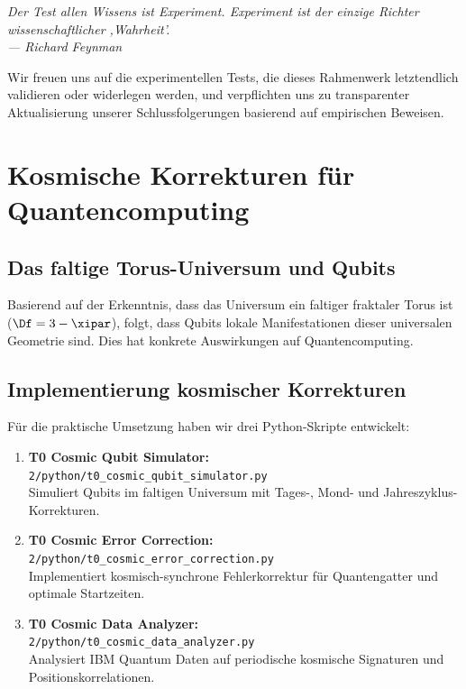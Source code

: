 \begin{center}
	\textit{Der Test allen Wissens ist Experiment. Experiment ist der einzige Richter wissenschaftlicher ,Wahrheit'.}\\
	\textit{--- Richard Feynman}
\end{center}

Wir freuen uns auf die experimentellen Tests, die dieses Rahmenwerk letztendlich validieren oder widerlegen werden, und verpflichten uns zu transparenter Aktualisierung unserer Schlussfolgerungen basierend auf empirischen Beweisen.

\section{Kosmische Korrekturen für Quantencomputing}
\label{sec:cosmic_corrections}

\subsection{Das faltige Torus-Universum und Qubits}

Basierend auf der Erkenntnis, dass das Universum ein faltiger fraktaler Torus ist 
($\Df = 3 - \xipar$), folgt, dass Qubits lokale Manifestationen dieser 
universalen Geometrie sind. Dies hat konkrete Auswirkungen auf Quantencomputing.

\subsection{Implementierung kosmischer Korrekturen}

Für die praktische Umsetzung haben wir drei Python-Skripte entwickelt:

\begin{enumerate}
	\item \textbf{T0 Cosmic Qubit Simulator:} \\
	\texttt{2/python/t0\_cosmic\_qubit\_simulator.py} \\
	Simuliert Qubits im faltigen Universum mit Tages-, Mond- und Jahreszyklus-Korrekturen.
	
	\item \textbf{T0 Cosmic Error Correction:} \\
	\texttt{2/python/t0\_cosmic\_error\_correction.py} \\
	Implementiert kosmisch-synchrone Fehlerkorrektur für Quantengatter und optimale Startzeiten.
	
	\item \textbf{T0 Cosmic Data Analyzer:} \\
	\texttt{2/python/t0\_cosmic\_data\_analyzer.py} \\
	Analysiert IBM Quantum Daten auf periodische kosmische Signaturen und Positionskorrelationen.
\end{enumerate}

